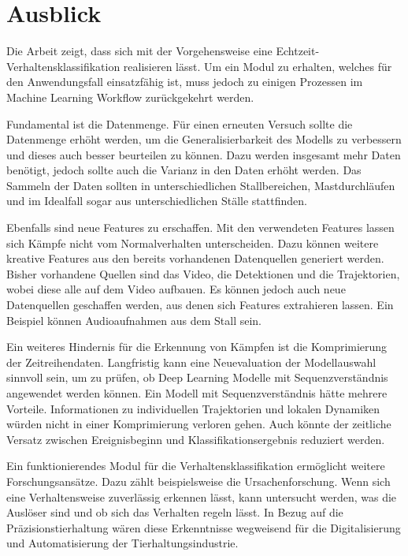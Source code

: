\section{Ausblick}

Die Arbeit zeigt, dass sich mit der Vorgehensweise eine Echtzeit-Verhaltensklassifikation realisieren lässt. Um ein Modul zu erhalten, welches für den Anwendungsfall einsatzfähig ist, muss jedoch zu einigen Prozessen im Machine Learning Workflow zurückgekehrt werden. \par

Fundamental ist die Datenmenge. Für einen erneuten Versuch sollte die Datenmenge erhöht werden, um die Generalisierbarkeit des Modells zu verbessern und dieses auch besser beurteilen zu können. Dazu werden insgesamt mehr Daten benötigt, jedoch sollte auch die Varianz in den Daten erhöht werden. Das Sammeln der Daten sollten in unterschiedlichen Stallbereichen, Mastdurchläufen und im Idealfall sogar aus unterschiedlichen Ställe stattfinden. \par

Ebenfalls sind neue Features zu erschaffen. Mit den verwendeten Features lassen sich Kämpfe nicht vom Normalverhalten unterscheiden. Dazu können weitere kreative Features aus den bereits vorhandenen Datenquellen generiert werden. Bisher vorhandene Quellen sind das Video, die Detektionen und die Trajektorien, wobei diese alle auf dem Video aufbauen. Es können jedoch auch neue Datenquellen geschaffen werden, aus denen sich Features extrahieren lassen. Ein Beispiel können Audioaufnahmen aus dem Stall sein. \par

Ein weiteres Hindernis für die Erkennung von Kämpfen ist die Komprimierung der Zeitreihendaten. Langfristig kann eine Neuevaluation der Modellauswahl sinnvoll sein, um zu prüfen, ob Deep Learning Modelle mit Sequenzverständnis angewendet werden können. Ein Modell mit Sequenzverständnis hätte mehrere Vorteile. Informationen zu individuellen Trajektorien und lokalen Dynamiken würden nicht in einer Komprimierung verloren gehen. Auch könnte der zeitliche Versatz zwischen Ereignisbeginn und Klassifikationsergebnis reduziert werden. \par

Ein funktionierendes Modul für die Verhaltensklassifikation ermöglicht weitere Forschungsansätze. Dazu zählt beispielsweise die Ursachenforschung. Wenn sich eine Verhaltensweise zuverlässig erkennen lässt, kann untersucht werden, was die Auslöser sind und ob sich das Verhalten regeln lässt. In Bezug auf die Präzisionstierhaltung wären diese Erkenntnisse wegweisend für die Digitalisierung und Automatisierung der Tierhaltungsindustrie.